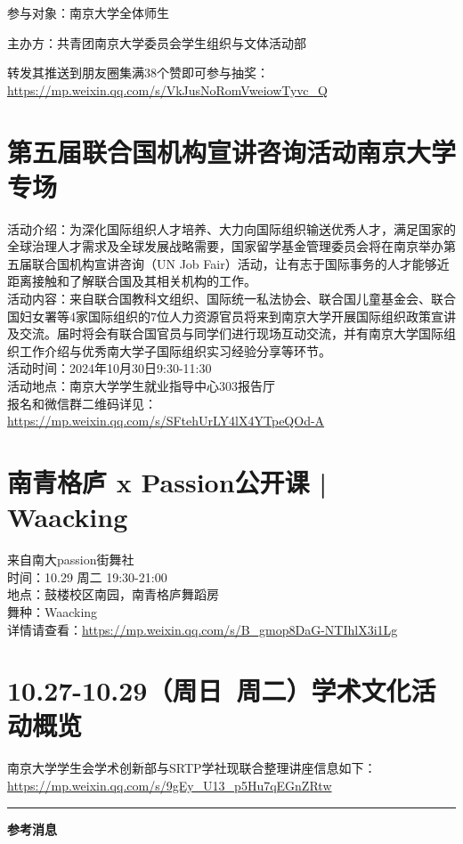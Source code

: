 \documentclass[letterpaper, 12pt]{article}
\begin{document}
\begin{multicols}{2}
参与对象：南京大学全体师生

主办方：共青团南京大学委员会学生组织与文体活动部

转发其推送到朋友圈集满38个赞即可参与抽奖：\url{https://mp.weixin.qq.com/s/VkJusNoRomVweiowTyvc_Q}
\section{第五届联合国机构宣讲咨询活动南京大学专场}
活动介绍：为深化国际组织人才培养、大力向国际组织输送优秀人才，满足国家的全球治理人才需求及全球发展战略需要，国家留学基金管理委员会将在南京举办第五届联合国机构宣讲咨询（UN Job Fair）活动，让有志于国际事务的人才能够近距离接触和了解联合国及其相关机构的工作。\\
活动内容：来自联合国教科文组织、国际统一私法协会、联合国儿童基金会、联合国妇女署等4家国际组织的7位人力资源官员将来到南京大学开展国际组织政策宣讲及交流。届时将会有联合国官员与同学们进行现场互动交流，并有南京大学国际组织工作介绍与优秀南大学子国际组织实习经验分享等环节。\\
活动时间：2024年10月30日9:30-11:30\\
活动地点：南京大学学生就业指导中心303报告厅\\
报名和微信群二维码详见：\url{https://mp.weixin.qq.com/s/SFtehUrLY4lX4YTpeQOd-A}

\section{南青格庐 x Passion公开课 | Waacking}
来自南大passion街舞社\\
时间：10.29 周二 19:30-21:00\\
地点：鼓楼校区南园，南青格庐舞蹈房\\
舞种：Waacking\\
详情请查看：\url{https://mp.weixin.qq.com/s/B_gmop8DaG-NTIhlX3i1Lg}\\
\section{10.27-10.29（周日~周二）学术文化活动概览}
南京大学学生会学术创新部与SRTP学社现联合整理讲座信息如下：\\
\url{https://mp.weixin.qq.com/s/9gEy_U13_p5Hu7qEGnZRtw}\\
\end{multicols} 
\hrule
\vspace{4mm}
\centerline{\huge\textbf{参考消息}}
\end{document}

